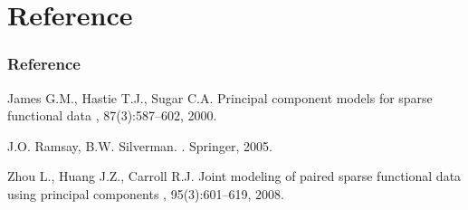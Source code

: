 \documentclass{beamer}
\begin{document}
\section{Reference}
\begin{frame}
  \frametitle<presentation>{Reference}
    
  \begin{thebibliography}{10}
  	\beamertemplatearticlebibitems
		James G.M., Hastie T.J., Sugar C.A.
		\newblock Principal component models for sparse functional data
		, 87(3):587--602,
		2000.
    
  \beamertemplatebookbibitems
		J.O. Ramsay, B.W. Silverman.
		.
		\newblock Springer, 2005.
		
   	\beamertemplatearticlebibitems
		 Zhou L., Huang J.Z., Carroll R.J.
		 \newblock Joint modeling of paired sparse functional data using principal components
		 , 95(3):601--619,
		 2008.
    

  \end{thebibliography}
\end{frame}


%
%    
%    
%
% 
%    
%
\end{document}
